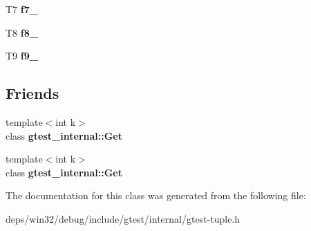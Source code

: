 \begin{DoxyCompactItemize}
\item 
\hypertarget{classstd_1_1tr1_1_1tuple_a7c28780e616d382833e844f62672c6bc}{}T7 {\bfseries f7\+\_\+}\label{classstd_1_1tr1_1_1tuple_a7c28780e616d382833e844f62672c6bc}

\item 
\hypertarget{classstd_1_1tr1_1_1tuple_ae859012c83943e54e035a4a32089ccb6}{}T8 {\bfseries f8\+\_\+}\label{classstd_1_1tr1_1_1tuple_ae859012c83943e54e035a4a32089ccb6}

\item 
\hypertarget{classstd_1_1tr1_1_1tuple_a336d5e582fd34e45ec88c78d473671dd}{}T9 {\bfseries f9\+\_\+}\label{classstd_1_1tr1_1_1tuple_a336d5e582fd34e45ec88c78d473671dd}

\end{DoxyCompactItemize}
\subsection*{Friends}
\begin{DoxyCompactItemize}
\item 
\hypertarget{classstd_1_1tr1_1_1tuple_aeeed38755abdaa78587dd1eac9ccc950}{}{\footnotesize template$<$int k$>$ }\\class {\bfseries gtest\+\_\+internal\+::\+Get}\label{classstd_1_1tr1_1_1tuple_aeeed38755abdaa78587dd1eac9ccc950}

\item 
\hypertarget{classstd_1_1tr1_1_1tuple_a266bb701b0bf866007d5865d36f87bd1}{}{\footnotesize template$<$int k$>$ }\\class {\bfseries gtest\+\_\+internal\+::\+Get}\label{classstd_1_1tr1_1_1tuple_a266bb701b0bf866007d5865d36f87bd1}

\end{DoxyCompactItemize}


The documentation for this class was generated from the following file\+:\begin{DoxyCompactItemize}
\item 
deps/win32/debug/include/gtest/internal/gtest-\/tuple.\+h\end{DoxyCompactItemize}
